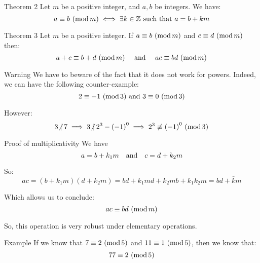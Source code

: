 \documentclass[a4paper]{article}
\begin{document}
\begin{parag}{Theorem 2}
    Let $m$ be a positive integer, and $a,b$ be integers. We have:
    \[a \equiv b\ (\operatorname{mod} m) \iff \exists k \in \mathbb{Z} \text{ such that } a = b + km\]
\end{parag}

\begin{parag}{Theorem 3}
    Let $m$ be a positive integer. If $a \equiv b\ (\operatorname{mod} m)$ and $c \equiv d\ (\operatorname{mod} m)$ then:
    \[a+c \equiv b+d\ (\operatorname{mod} m) \quad \text{ and } \quad ac \equiv bd\ (\operatorname{mod} m)\]

    \begin{subparag}{Warning}
        We have to beware of the fact that it does not work for powers. Indeed, we can have the following counter-example: 
        \[2 \equiv -1\ (\operatorname{mod} 3) \text{ and } 3 \equiv 0\ (\operatorname{mod} 3)\]
        
        However:
        \[3 \ndivides 7 \implies 3 \ndivides 2^3 - \left(-1\right)^{0} \implies \notcongruent{2^3}{\left(-1\right)^0}{3}\]
    \end{subparag}

    \begin{subparag}{Proof of multiplicativity}
        We have  
        \[a = b + k_1m \quad \text{and} \quad c = d + k_2 m\]
        
        So: 
        \[ac = \left(b + k_1m\right)\left(d + k_2m\right) = bd + k_1md + k_2mb + k_1k_2m = bd + \bar{k}m\]

        Which allows us to conclude:
        \[ac \equiv bd\ (\operatorname{mod} m)\]
        
    \end{subparag}

    So, this operation is very robust under elementary operations.
\end{parag}

\begin{parag}{Example}
    If we know that $7 \equiv 2\ (\operatorname{mod} 5)$ and $11 \equiv 1\ (\operatorname{mod} 5)$, then we know that: 
    \[77 \equiv 2\ (\operatorname{mod} 5)\]
\end{parag}
\end{document}
